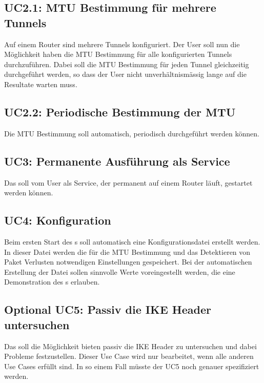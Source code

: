 \subsection{UC2.1: MTU Bestimmung für mehrere Tunnels}
Auf einem Router sind mehrere Tunnels konfiguriert. Der User soll nun die Möglichkeit haben die \ac{MTU} Bestimmung für alle konfigurierten Tunnels durchzuführen. Dabei soll die \ac{MTU} Bestimmung für jeden Tunnel gleichzeitig durchgeführt werden, so dass der User nicht unverhältnismässig lange auf die Resultate warten muss.

\subsection{UC2.2: Periodische Bestimmung der MTU}
Die \ac{MTU} Bestimmung soll automatisch, periodisch durchgeführt werden können.

\subsection{UC3: Permanente Ausführung als Service}
Das \tool{} soll vom User als Service, der permanent auf einem Router läuft, gestartet werden können.

\subsection{UC4: Konfiguration}
Beim ersten Start des \tool{}s soll automatisch eine Konfigurationsdatei erstellt werden. In dieser Datei werden die für die \ac{MTU} Bestimmung und das Detektieren von Paket Verlusten notwendigen Einstellungen gespeichert. Bei der automatischen Erstellung der Datei sollen sinnvolle Werte voreingestellt werden, die eine Demonstration des \tool{}s erlauben.

\subsection{Optional UC5: Passiv die IKE Header untersuchen}
Das \tool{} soll die Möglichkeit bieten passiv die \ac{IKE} Header zu untersuchen und dabei Probleme festzustellen. Dieser Use Case wird nur bearbeitet, wenn alle anderen Use Cases erfüllt sind. In so einem Fall müsste der UC5 noch genauer spezifiziert werden.